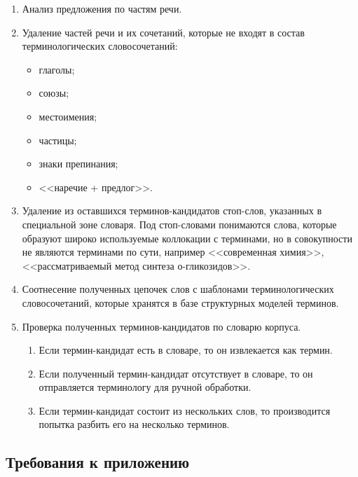 \begin{enumerate}[label*=\arabic*.]
	\item Анализ предложения по частям речи.
	\item Удаление частей речи и их сочетаний, которые не входят в состав терминологических словосочетаний:
	
	\begin{itemize}[label*=---]
		\item глаголы;
		\item союзы;
		\item местоимения;
		\item частицы;
		\item знаки препинания;
		\item <<наречие + предлог>>.
		
	\end{itemize}
	
	\item Удаление из оставшихся терминов-кандидатов стоп-слов, указанных в специальной зоне словаря. Под стоп-словами понимаются слова, которые образуют широко используемые коллокации с терминами, но в совокупности не являются терминами по сути, например <<современная химия>>, <<рассматриваемый метод синтеза о-гликозидов>>.
	\item Соотнесение полученных цепочек слов с шаблонами терминологических словосочетаний, которые хранятся в базе структурных моделей терминов.
	\item Проверка полученных терминов-кандидатов по словарю корпуса.
	
	\begin{enumerate}[label*=\arabic*.]
		
	\item Если термин-кандидат есть в словаре, то он извлекается как термин.
	\item Если полученный термин-кандидат отсутствует в словаре, то он отправляется терминологу для ручной обработки.
	\item Если термин-кандидат состоит из нескольких слов, то производится попытка разбить его на несколько терминов.
	
	\end{enumerate}
	
\end{enumerate}



\subsection{Требования к приложению}

